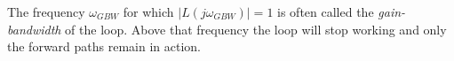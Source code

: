  The frequency $\omega _{\mathit {GBW}}$ for which $|L(j\omega _{\mathit {GBW}})| = 1$ is often called the \emph {gain-bandwidth} of the loop. Above that frequency the loop will stop working and only the forward paths remain in action. 
